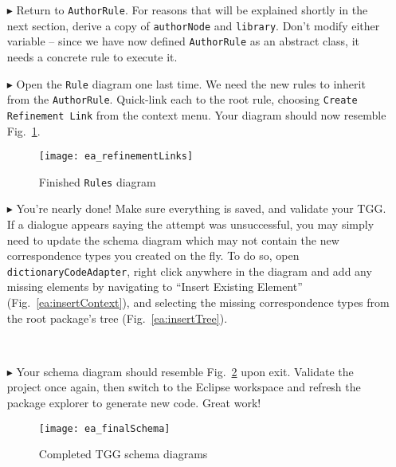 \begin{itemize}
\item[$\blacktriangleright$] Return to \texttt{AuthorRule}. For reasons that will be explained shortly in the next section, derive a copy of \texttt{authorNode}
and \texttt{library}. Don't modify either variable -- since we have now defined \texttt{AuthorRule} as an abstract class, it needs a concrete rule to execute
it.

\item[$\blacktriangleright$] Open the \texttt{Rule} diagram one last time. We need the new rules to inherit from the \texttt{AuthorRule}. Quick-link
each to the root rule, choosing \texttt{Create Refinement Link} from the context menu. Your diagram should now resemble Fig.~\ref{ea:refinementClasses}.

\begin{figure}[htbp]
\begin{center}
  \texttt{[image: ea\_refinementLinks]}
  \caption{Finished \texttt{Rules} diagram}
  \label{ea:refinementClasses}
\end{center}
\end{figure}


\item[$\blacktriangleright$] You're nearly done! Make sure everything is saved, and validate your TGG. If a dialogue appears saying the attempt was
unsuccessful, you may simply need to update the schema diagram which may not contain the new correspondence types you created on the fly. To do so, open
\texttt{dictionaryCodeAdapter}, right click anywhere in the diagram and add any missing elements by navigating to ``Insert Existing Element''
(Fig.~\ref{ea:insertContext}), and selecting the missing correspondence types from the root package's tree (Fig.~\ref{ea:insertTree}).

\begin{figure}[htbp]
   \centering
      \\
\end{figure}

\item[$\blacktriangleright$] Your schema diagram should resemble Fig.~\ref{ea:Schema_Complete} upon exit. Validate the project once again, then switch to the
Eclipse workspace and refresh the package explorer to generate new code. Great work!

\newpage

\vspace*{3cm}

\begin{figure}[htbp]
\begin{center}
  \texttt{[image: ea\_finalSchema]}
  \caption{Completed TGG schema diagrams}
  \label{ea:Schema_Complete}
\end{center}
\end{figure}


\end{itemize}
